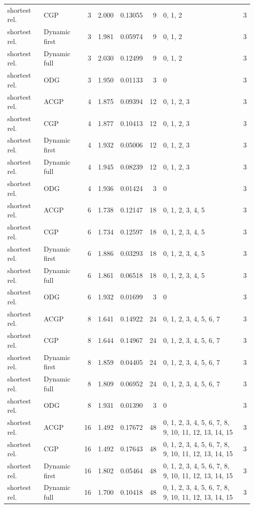 \documentclass[10pt,a4paper]{article}
\begin{document}
\begin{longtable}{@{}p{23mm}p{29mm}rrrrp{36mm}r@{}}
shortest rel. & CGP & 3 & 2.000 & 0.13055 & 9 & 0, 1, 2 & 3 \\
shortest rel. & Dynamic first & 3 & 1.981 & 0.05974 & 9 & 0, 1, 2 & 3 \\
shortest rel. & Dynamic full & 3 & 2.030 & 0.12499 & 9 & 0, 1, 2 & 3 \\
shortest rel. & ODG & 3 & 1.950 & 0.01133 & 3 & 0 & 3 \\
shortest rel. & ACGP & 4 & 1.875 & 0.09394 & 12 & 0, 1, 2, 3 & 3 \\
shortest rel. & CGP & 4 & 1.877 & 0.10413 & 12 & 0, 1, 2, 3 & 3 \\
shortest rel. & Dynamic first & 4 & 1.932 & 0.05006 & 12 & 0, 1, 2, 3 & 3 \\
shortest rel. & Dynamic full & 4 & 1.945 & 0.08239 & 12 & 0, 1, 2, 3 & 3 \\
shortest rel. & ODG & 4 & 1.936 & 0.01424 & 3 & 0 & 3 \\
shortest rel. & ACGP & 6 & 1.738 & 0.12147 & 18 & 0, 1, 2, 3, 4, 5 & 3 \\
shortest rel. & CGP & 6 & 1.734 & 0.12597 & 18 & 0, 1, 2, 3, 4, 5 & 3 \\
shortest rel. & Dynamic first & 6 & 1.886 & 0.03293 & 18 & 0, 1, 2, 3, 4, 5 & 3 \\
shortest rel. & Dynamic full & 6 & 1.861 & 0.06518 & 18 & 0, 1, 2, 3, 4, 5 & 3 \\
shortest rel. & ODG & 6 & 1.932 & 0.01699 & 3 & 0 & 3 \\
shortest rel. & ACGP & 8 & 1.641 & 0.14922 & 24 & 0, 1, 2, 3, 4, 5, 6, 7 & 3 \\
shortest rel. & CGP & 8 & 1.644 & 0.14967 & 24 & 0, 1, 2, 3, 4, 5, 6, 7 & 3 \\
shortest rel. & Dynamic first & 8 & 1.859 & 0.04405 & 24 & 0, 1, 2, 3, 4, 5, 6, 7 & 3 \\
shortest rel. & Dynamic full & 8 & 1.809 & 0.06952 & 24 & 0, 1, 2, 3, 4, 5, 6, 7 & 3 \\
shortest rel. & ODG & 8 & 1.931 & 0.01390 & 3 & 0 & 3 \\
shortest rel. & ACGP & 16 & 1.492 & 0.17672 & 48 & 0, 1, 2, 3, 4, 5, 6, 7, 8, 9, 10, 11, 12, 13, 14, 15 & 3 \\
shortest rel. & CGP & 16 & 1.492 & 0.17643 & 48 & 0, 1, 2, 3, 4, 5, 6, 7, 8, 9, 10, 11, 12, 13, 14, 15 & 3 \\
shortest rel. & Dynamic first & 16 & 1.802 & 0.05464 & 48 & 0, 1, 2, 3, 4, 5, 6, 7, 8, 9, 10, 11, 12, 13, 14, 15 & 3 \\
shortest rel. & Dynamic full & 16 & 1.700 & 0.10418 & 48 & 0, 1, 2, 3, 4, 5, 6, 7, 8, 9, 10, 11, 12, 13, 14, 15 & 3 \\

\end{longtable}
\end{document}
